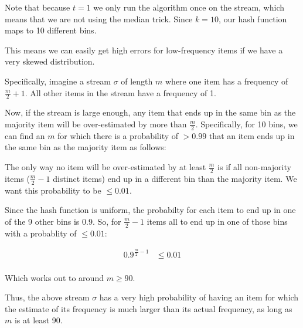 Note that because $t = 1$ we only run the algorithm once on the stream, which means that we are not using the median trick.
Since $k = 10$, our hash function maps to 10 different bins.

This means we can easily get high errors for low-frequency items if we have a very skewed distribution.

Specifically, imagine a stream $\sigma$ of length $m$ where one item has a frequency of $\frac{m}{2} + 1$.
All other items in the stream have a frequency of 1.

Now, if the stream is large enough, any item that ends up in the same bin as the majority item will be over-estimated by more than $\frac{m}{2}$.
Specifically, for 10 bins, we can find an $m$ for which there is a probability of $> 0.99$ that an item ends up in the same bin as the majority item as follows:

The only way no item will be over-estimated by at least $\frac{m}{2}$ is if all non-majority items ($\frac{m}{2} - 1$ distinct items) end up in a different bin than the majority item.
We want this probability to be $\leq 0.01$.

Since the hash function is uniform, the probabilty for each item to end up in one of the 9 other bins is 0.9.
So, for $\frac{m}{2} - 1$ items all to end up in one of those bins with a probablity of $\leq 0.01$:

\[
\begin{split}
	0.9^{\frac{m}{2}-1} &\leq 0.01\\
\end{split}
\]

Which works out to around $m \geq 90$.

Thus, the above stream $\sigma$ has a very high probability of having an item for which the estimate of its frequency is much larger than its actual frequency, as long as $m$ is at least 90.
